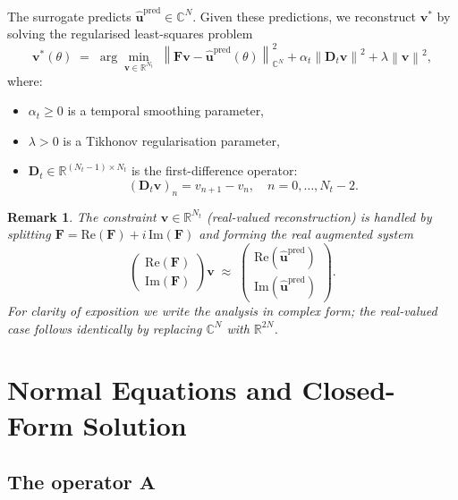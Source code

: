 \documentclass[11pt, a4paper]{article}
\newtheorem{remark}[theorem]{Remark}
\newcommand{\R}{\mathbb{R}}
\newcommand{\C}{\mathbb{C}}
\newcommand{\norm}[1]{\left\|#1\right\|}
\begin{document}
The surrogate predicts $\hat{\mathbf{u}}^{\mathrm{pred}} \in \C^N$.
Given these predictions, we reconstruct $\mathbf{v}^*$ by solving the
regularised least-squares problem
\begin{equation}
  \label{eq:inv_problem}
  \mathbf{v}^*(\theta)
  \;=\;
  \arg\min_{\mathbf{v} \in \R^{N_t}}
  \;\norm{\mathbf{F}\mathbf{v} - \hat{\mathbf{u}}^{\mathrm{pred}}(\theta)}_{\C^N}^2
  + \alpha_t \norm{\mathbf{D}_t \mathbf{v}}^2
  + \lambda \norm{\mathbf{v}}^2,
\end{equation}
where:
\begin{itemize}
  \item $\alpha_t \geq 0$ is a temporal smoothing parameter,
  \item $\lambda > 0$ is a Tikhonov regularisation parameter,
  \item $\mathbf{D}_t \in \R^{(N_t-1)\times N_t}$ is the first-difference
        operator:
        \[
          (\mathbf{D}_t \mathbf{v})_n = v_{n+1} - v_n,
          \quad n = 0,\ldots,N_t-2.
        \]
\end{itemize}

\begin{remark}
  The constraint $\mathbf{v} \in \R^{N_t}$ (real-valued reconstruction) is
  handled by splitting $\mathbf{F} = \mathrm{Re}(\mathbf{F}) + i\,\mathrm{Im}(\mathbf{F})$
  and forming the real augmented system
  \[
    \begin{pmatrix} \mathrm{Re}(\mathbf{F}) \\ \mathrm{Im}(\mathbf{F}) \end{pmatrix}
    \mathbf{v}
    \;\approx\;
    \begin{pmatrix} \mathrm{Re}(\hat{\mathbf{u}}^{\mathrm{pred}}) \\
                    \mathrm{Im}(\hat{\mathbf{u}}^{\mathrm{pred}}) \end{pmatrix}.
  \]
  For clarity of exposition we write the analysis in complex form; the
  real-valued case follows identically by replacing $\C^N$ with $\R^{2N}$.
\end{remark}

\section{Normal Equations and Closed-Form Solution}

\subsection{The operator $\mathbf{A}$}
\end{document}

